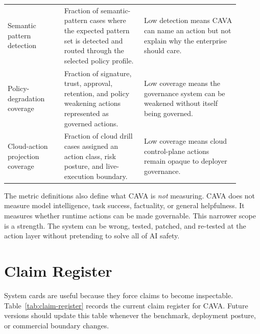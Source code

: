 \documentclass[11pt]{article}
\begin{document}
\begin{longtable}{@{}L{0.22\linewidth}L{0.31\linewidth}L{0.37\linewidth}@{}}
Semantic pattern detection & Fraction of semantic-pattern cases where the expected pattern set is detected and routed through the selected policy profile. & Low detection means CAVA can name an action but not explain why the enterprise should care. \\
Policy-degradation coverage & Fraction of signature, trust, approval, retention, and policy weakening actions represented as governed actions. & Low coverage means the governance system can be weakened without itself being governed. \\
Cloud-action projection coverage & Fraction of cloud drill cases assigned an action class, risk posture, and live-execution boundary. & Low coverage means cloud control-plane actions remain opaque to deployer governance. \\
\bottomrule
\end{longtable}

The metric definitions also define what CAVA is \emph{not} measuring. CAVA does not measure model intelligence, task success, factuality, or general helpfulness. It measures whether runtime actions can be made governable. This narrower scope is a strength. The system can be wrong, tested, patched, and re-tested at the action layer without pretending to solve all of AI safety.

\section{Claim Register}

System cards are useful because they force claims to become inspectable. Table~\ref{tab:claim-register} records the current claim register for CAVA. Future versions should update this table whenever the benchmark, deployment posture, or commercial boundary changes.
\end{document}
